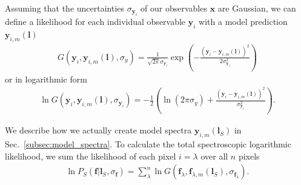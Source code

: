 \documentclass[
  journal=pasa,
  manuscript=research-paper, %
  year=2021,
  volume=37,
]{cup-journal}
\begin{document}
Assuming that the uncertainties $\sigma_{\boldsymbol{y}_i}$ of our observables $\boldsymbol{x}$ are Gaussian, we can define a likelihood for each individual observable ${\boldsymbol{y}_i}$ with a model prediction $\boldsymbol{y}_{i,m} (\boldsymbol{l})$
\begin{align}
    G({\boldsymbol{y}_i}, {\boldsymbol{y}_{i,m}} (\boldsymbol{l}), \sigma_y) = \frac{1}{\sqrt{2\pi} \sigma_{\boldsymbol{y}_i}} \exp \left( -  \frac{\left({\boldsymbol{y}_i} - {\boldsymbol{y}_{i,m}} (\boldsymbol{l})\right)^2}{2 \sigma_{\boldsymbol{y}_i}^2}\right)
\end{align}
or in logarithmic form
\begin{align}
    \ln G({\boldsymbol{y}_i}, {\boldsymbol{y}_{i,m}} (\boldsymbol{l}), \sigma_{\boldsymbol{y}_i}) = - \frac{1}{2} \left( \ln (2 \pi \sigma_y) + \frac{\left({\boldsymbol{y}_i} - {\boldsymbol{y}_{i,m}} (\boldsymbol{l})\right)^2}{\sigma_{\boldsymbol{y}_i}^2} \right).
\end{align}

We describe how we actually create model spectra ${\boldsymbol{y}_{i,m}} (\boldsymbol{l}_S)$ in Sec.~\ref{subsec:model_spectra}. To calculate the total spectroscopic logarithmic likelihood, we sum the likelihood of each pixel $i=\lambda$ over all $n$ pixels
\begin{align} \label{eq:likelihood_spectroscopic}
    \ln P_S ({\boldsymbol{f}} \vert {\boldsymbol{l}_S}, \sigma_{\boldsymbol{f}}) = \sum_\lambda^n \ln G({\boldsymbol{f}_\lambda}, {\boldsymbol{f}_{\lambda,m}} (\boldsymbol{l}_S), \sigma_{\boldsymbol{f}_\lambda}).
\end{align}
\end{document}
